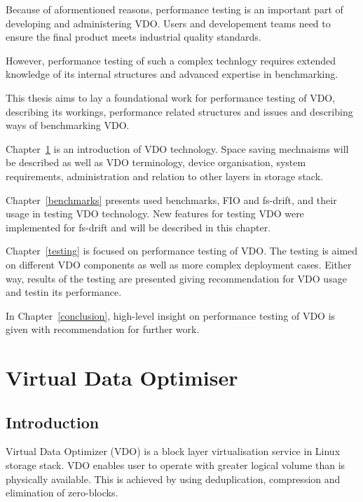 \documentclass[
  color, %
  table, %
  lof,   %
  lot,   %
]{fithesis3}
\begin{document}
Because of aformentioned reasons, performance testing is an important part of developing and administering VDO. Users and developement teams need to ensure the final product meets industrial quality standards.

However, performance testing of such a complex technlogy requires extended knowledge of its internal structures and advanced expertise in benchmarking. 

This thesis aims to lay a foundational work for performance testing of VDO, describing its workings, performance related structures and issues and describing ways of benchmarking VDO. 

Chapter~\ref{VDO} is an introduction of VDO technology. Space saving mechnaisms will be described as well as VDO terminology, device organisation, system requirements, administration and relation to other layers in storage stack.

Chapter~\ref{benchmarks} presents used benchmarks, FIO and fs-drift, and their usage in testing VDO technology. New features for testing VDO were implemented for fs-drift and will be described in this chapter.

Chapter~\ref{testing} is focused on performance testing of VDO. The testing is aimed on different VDO components as well as more complex deployment cases. Either way, results of the testing are presented giving recommendation for VDO usage and testin its performance.

In Chapter~\ref{conclusion}, high-level insight on performance testing of VDO is given with recommendation for further work.


\chapter{Virtual Data Optimiser}
\label{VDO}
\section{Introduction}
Virtual Data Optimizer (VDO) is a block layer virtualisation service in Linux storage stack. VDO enables user to operate with greater logical volume than is physically available. This is achieved by using deduplication, compression and elimination of zero-blocks.
\end{document}
